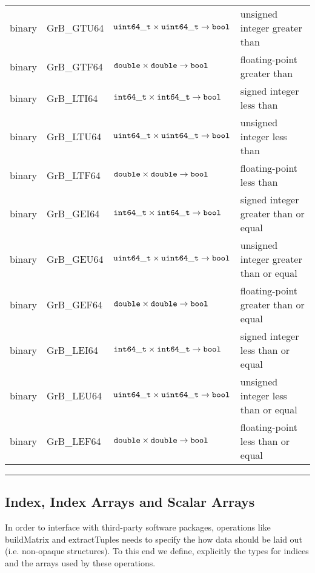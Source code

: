 \begin{table}
\begin{center}
\begin{tabular}{l|l|l|l}
binary   & {\sf GrB\_GTU64}    & ${\tt uint64\_t} \times {\tt uint64\_t} \rightarrow {\tt bool}$      & unsigned integer greater than  \\
binary   & {\sf GrB\_GTF64}    & ${\tt double} \times {\tt double} \rightarrow {\tt bool}$            & floating-point greater than  \\
binary   & {\sf GrB\_LTI64}    & ${\tt int64\_t} \times {\tt int64\_t} \rightarrow {\tt bool}$        & signed integer less than  \\
binary   & {\sf GrB\_LTU64}    & ${\tt uint64\_t} \times {\tt uint64\_t} \rightarrow {\tt bool}$      & unsigned integer less than  \\
binary   & {\sf GrB\_LTF64}    & ${\tt double} \times {\tt double} \rightarrow {\tt bool}$            & floating-point less than  \\
binary   & {\sf GrB\_GEI64}    & ${\tt int64\_t} \times {\tt int64\_t} \rightarrow {\tt bool}$        & signed integer greater than or equal \\
binary   & {\sf GrB\_GEU64}    & ${\tt uint64\_t} \times {\tt uint64\_t} \rightarrow {\tt bool}$      & unsigned integer greater than or equal \\
binary   & {\sf GrB\_GEF64}    & ${\tt double} \times {\tt double} \rightarrow {\tt bool}$            & floating-point greater than or equal \\
binary   & {\sf GrB\_LEI64}    & ${\tt int64\_t} \times {\tt int64\_t} \rightarrow {\tt bool}$        & signed integer less than or equal \\
binary   & {\sf GrB\_LEU64}    & ${\tt uint64\_t} \times {\tt uint64\_t} \rightarrow {\tt bool}$      & unsigned integer less than or equal \\
binary   & {\sf GrB\_LEF64}    & ${\tt double} \times {\tt double} \rightarrow {\tt bool}$            & floating-point less than or equal \\
\end{tabular}
\end{center}
\hrule
\end{table}

\subsection{Index, Index Arrays and Scalar Arrays}

In order to interface with third-party software packages, operations like buildMatrix and extractTuples needs to specify the how data should be laid out (i.e. non-opaque structures).  To this end we define, explicitly the types for indices and the arrays used by these operations.

